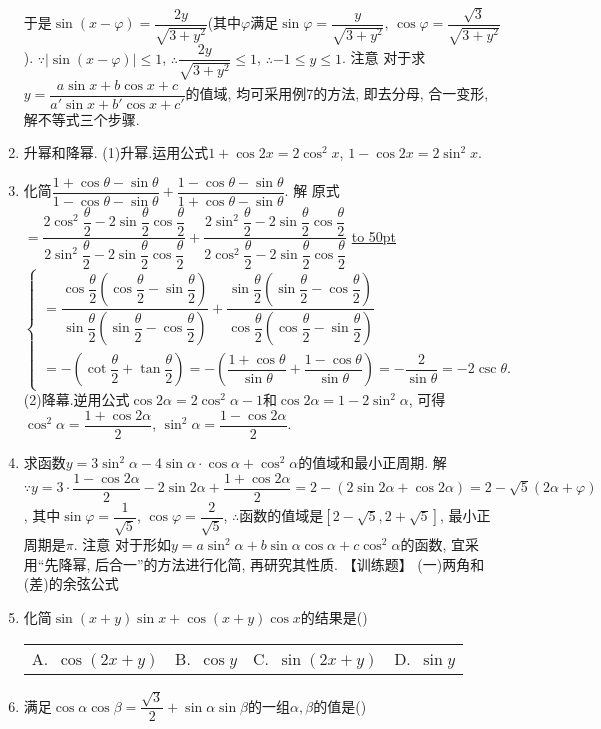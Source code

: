 \documentclass[10pt,a4paper]{article}
\newcommand{\blank}[1]{\underline{\hbox to #1pt{}}}
\newcommand{\fourch}[4]{\par\begin{tabular}{p{.23\textwidth}p{.23\textwidth}p{.23\textwidth}p{.23\textwidth}}
A.~#1 &B.~#2& C.~#3& D.~#4
\end{tabular}}
\begin{document}
\begin{enumerate}[1.]
于是$\sin (x-\varphi)=\dfrac{2y}{\sqrt {3+y^2}}$(其中$\varphi$满足$\sin \varphi =\dfrac y{\sqrt {3+y^2}}$, $\cos \varphi =\dfrac{\sqrt 3}{\sqrt {3+y^2}}$).
$\because|\sin (x-\varphi)|\le 1$, $\therefore \dfrac{2y}{\sqrt {3+y^2}}\le 1$, $\therefore -1\le y\le 1$.
注意  对于求$y=\dfrac{a\sin x+b\cos x+c}{a'\sin x+b'\cos x+c'}$的值域, 均可采用例7的方法, 即去分母, 合一变形, 解不等式三个步骤.
\item 升幂和降幂.
(1)升幂.运用公式$1+\cos 2x=2\cos ^2x$, $1-\cos 2x=2\sin ^2x$.
\item 化简$\dfrac{1+\cos \theta -\sin \theta }{1-\cos \theta -\sin \theta }+\dfrac{1-\cos \theta -\sin \theta }{1+\cos \theta -\sin \theta }$.
解  原式$=\dfrac{2\cos ^2\dfrac{\theta }2-2\sin \dfrac{\theta }2\cos \dfrac{\theta }2}{2\sin ^2\dfrac{\theta }2-2\sin \dfrac{\theta }2\cos \dfrac{\theta }2}+\dfrac{2\sin ^2\dfrac{\theta }2-2\sin \dfrac{\theta }2\cos \dfrac{\theta }2}{2\cos ^2\dfrac{\theta }2-2\sin \dfrac{\theta }2\cos \dfrac{\theta }2}$
\blank{50}$\begin{cases} =\dfrac{\cos \dfrac{\theta }2(\cos \dfrac{\theta }2-\sin \dfrac{\theta }2)}{\sin \dfrac{\theta }2(\sin \dfrac{\theta }2-\cos \dfrac{\theta }2)}+\dfrac{\sin \dfrac{\theta }2(\sin \dfrac{\theta }2-\cos \dfrac{\theta }2)}{\cos \dfrac{\theta }2(\cos \dfrac{\theta }2-\sin \dfrac{\theta }2)} \\ =-(\cot \dfrac\theta 2+\tan \dfrac{\theta }2)=-(\dfrac {1+\cos \theta }{\sin \theta }+\dfrac{1-\cos \theta }{\sin \theta })=-\dfrac 2{\sin \theta }=-2\csc \theta . \end{cases}$
(2)降幕.逆用公式$\cos 2\alpha =2\cos ^2\alpha -1$和$\cos 2\alpha =1-2\sin ^2\alpha$,
可得$\cos ^2\alpha =\dfrac{1+\cos 2\alpha }2$, $\sin ^2\alpha =\dfrac{1-\cos 2\alpha }2$.
\item 求函数$y=3\sin ^2\alpha -4\sin \alpha \cdot \cos \alpha +\cos ^2\alpha$的值域和最小正周期.
解  $\because y=3\cdot \dfrac{1-\cos 2\alpha }2-2\sin 2\alpha +\dfrac{1+\cos 2\alpha }2=2-(2\sin 2\alpha +\cos 2\alpha)=2-\sqrt 5(2\alpha +\varphi)$,
其中$\sin \varphi =\dfrac 1{\sqrt 5}$, $\cos \varphi =\dfrac 2{\sqrt 5}$, $\therefore$函数的值域是$[2-\sqrt 5,2+\sqrt 5]$, 最小正周期是$\pi$.
注意  对于形如$y=a\sin ^2\alpha +b\sin \alpha \cos \alpha +c\cos ^2\alpha$的函数, 宜采用``先降幂, 后合一''的方法进行化简, 再研究其性质.
【训练题】
(一)两角和(差)的余弦公式
\item 化简$\sin (x+y)\sin x+\cos (x+y)\cos x$的结果是()
\fourch{$\cos (2x+y)$}{$\cos y$}{$\sin (2x+y)$}{$\sin y$}
\item 满足$\cos \alpha \cos \beta =\dfrac{\sqrt 3}2+\sin \alpha \sin \beta$的一组$\alpha ,\beta$的值是()

\end{enumerate}
\end{document}
